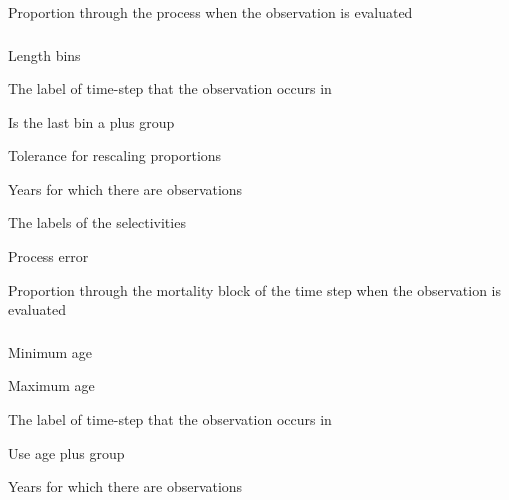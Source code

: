  {Proportion through the process when the observation is evaluated}

\subsubsection[Proportions At Length]{}

 {Length bins}

 {The label of time-step that the observation occurs in}

 {Is the last bin a plus group}

 {Tolerance for rescaling proportions}

 {Years for which there are observations}

 {The labels of the selectivities}

 {Process error}

 {Proportion through the mortality block of the time step when the observation is evaluated}

\subsubsection[Process Proportions By Category]{}

 {Minimum age}

 {Maximum age}

 {The label of time-step that the observation occurs in}

 {Use age plus group}

 {Years for which there are observations}

